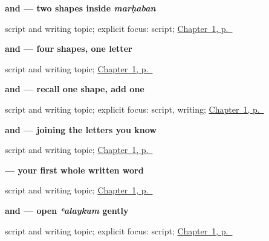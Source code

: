 \noindent\begin{minipage}[t]{\linewidth}
\raggedright
\textbf{ and  — two shapes inside \emph{marḥaban}}\par
\footnotesize script and writing topic; explicit focus: script; \hyperref[ch:greetings]{Chapter~1, p.~\pageref*{ch:greetings}}
\end{minipage}\par\smallskip

\noindent\begin{minipage}[t]{\linewidth}
\raggedright
\textbf{ and  — four shapes, one letter}\par
\footnotesize script and writing topic; \hyperref[ch:greetings]{Chapter~1, p.~\pageref*{ch:greetings}}
\end{minipage}\par\smallskip

\noindent\begin{minipage}[t]{\linewidth}
\raggedright
\textbf{ and  — recall one shape, add one}\par
\footnotesize script and writing topic; explicit focus: script, writing; \hyperref[ch:greetings]{Chapter~1, p.~\pageref*{ch:greetings}}
\end{minipage}\par\smallskip

\noindent\begin{minipage}[t]{\linewidth}
\raggedright
\textbf{ and  — joining the letters you know}\par
\footnotesize script and writing topic; \hyperref[ch:greetings]{Chapter~1, p.~\pageref*{ch:greetings}}
\end{minipage}\par\smallskip

\noindent\begin{minipage}[t]{\linewidth}
\raggedright
\textbf{ — your first whole written word}\par
\footnotesize script and writing topic; \hyperref[ch:greetings]{Chapter~1, p.~\pageref*{ch:greetings}}
\end{minipage}\par\smallskip

\noindent\begin{minipage}[t]{\linewidth}
\raggedright
\textbf{ and  — open \emph{ʿalaykum} gently}\par
\footnotesize script and writing topic; explicit focus: script; \hyperref[ch:greetings]{Chapter~1, p.~\pageref*{ch:greetings}}
\end{minipage}\par\smallskip

